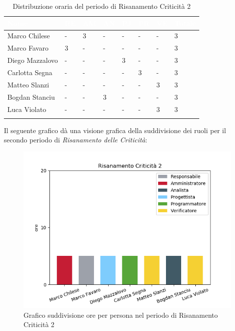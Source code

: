 \begin{longtable}{|C{.30\textwidth}|C{.06\textwidth}|C{.06\textwidth}|C{.06\textwidth} | C{.06\textwidth}| C{.06\textwidth} | C{.06\textwidth} | C{.10\textwidth} |}
\hline
{}	\textbf{\textcolor{white}{Nome}} & \textbf{\textcolor{white}{RE}} & \textbf{\textcolor{white}{AM}} & \textbf{\textcolor{white}{AN}} & \textbf{\textcolor{white}{PJ}} & \textbf{\textcolor{white}{PR}} & \textbf{\textcolor{white}{VE}} & \textbf{\textcolor{white}{Totale}}\\
\hline 
Marco Chilese & - & 3 & - & - & - & - & 3 \\
\hline
{}Marco Favaro & 3 & - & - & - & - & - & 3 \\
\hline
Diego Mazzalovo & - & - & - & 3 & - & - & 3 \\
\hline
{}Carlotta Segna & - & - & - & - & 3 & - & 3 \\
\hline
Matteo Slanzi & - & - & - & - & - & 3 & 3 \\
\hline
{}Bogdan Stanciu & - & - & 3 & - & - & - & 3 \\
\hline
Luca Violato & - & - & - & - & - & 3 & 3 \\   
\hline


\caption{Distribuzione oraria del periodo di Risanamento Criticità 2}
\label{Distribuzione oraria rc2}
\end{longtable}

Il seguente grafico dà una visione grafica della suddivisione dei ruoli per il secondo periodo di \textit{Risanamento delle Criticità}:\begin{figure}[H]
	\centering
  		\includegraphics[width=0.8\linewidth]{./images/fig_rc2.png}
  		\caption{Grafico suddivisione ore per persona nel periodo di Risanamento Criticità 2}
  		\label{fig:grafico suddivione ruoli rc2}
\end{figure}



